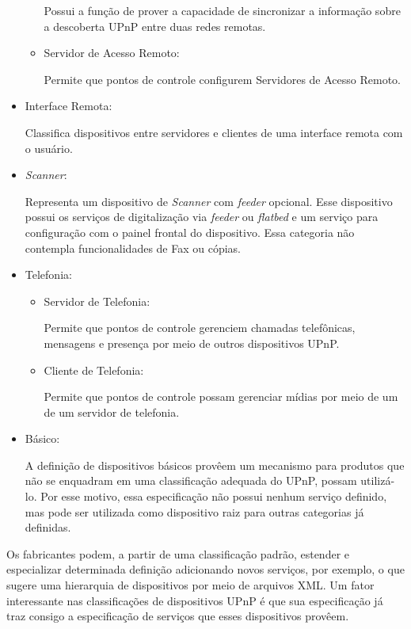 \begin{itemize}
\begin{itemize}
			Possui a função de prover a capacidade de sincronizar a informação sobre a descoberta UPnP entre duas redes remotas.
		
		\item Servidor de Acesso Remoto:
		
			Permite que pontos de controle configurem Servidores de Acesso Remoto.

	\end{itemize}

\item Interface Remota:

	Classifica dispositivos entre servidores e clientes de uma interface remota com o usuário.

\item \emph{Scanner}:

	Representa um dispositivo de \emph{Scanner} com \emph{feeder} opcional. Esse dispositivo possui os serviços de digitalização via \emph{feeder} ou \emph{flatbed} e um serviço para configuração com o painel frontal do dispositivo. Essa categoria não contempla funcionalidades de Fax ou cópias.

\item Telefonia:
	\begin{itemize}
		\item Servidor de Telefonia:

			Permite que pontos de controle gerenciem chamadas telefônicas, mensagens e presença por meio de outros dispositivos UPnP. 

		\item Cliente de Telefonia:
		
			Permite que pontos de controle possam gerenciar mídias por meio de um de um servidor de telefonia.
				
	\end{itemize}

\item Básico:

	A definição de dispositivos básicos provêem um mecanismo para produtos que não se enquadram em uma classificação adequada do UPnP, possam utilizá-lo. Por esse motivo, essa especificação não possui nenhum serviço definido, mas pode ser utilizada como dispositivo raiz para outras categorias já definidas.
\end{itemize}

Os fabricantes podem, a partir de uma classificação padrão, estender e especializar determinada definição adicionando novos serviços, por exemplo, o que sugere uma hierarquia de dispositivos por meio de arquivos XML. Um fator interessante nas classificações de dispositivos UPnP é que sua especificação já traz consigo a especificação de serviços que esses dispositivos provêem. 
